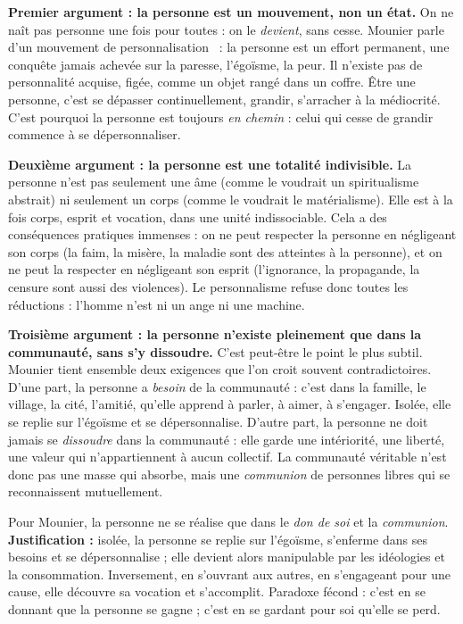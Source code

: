 \documentclass[11pt]{article}
\begin{document}
\textbf{Premier argument : la personne est un mouvement, non un état.} On ne naît pas personne une fois pour toutes : on le \emph{devient}, sans cesse. Mounier parle d'un \guillemotleft mouvement de personnalisation \guillemotright\ : la personne est un effort permanent, une conquête jamais achevée sur la paresse, l'égoïsme, la peur. Il n'existe pas de personnalité acquise, figée, comme un objet rangé dans un coffre. Être une personne, c'est se dépasser continuellement, grandir, s'arracher à la médiocrité. C'est pourquoi la personne est toujours \emph{en chemin} : celui qui cesse de grandir commence à se dépersonnaliser.

\textbf{Deuxième argument : la personne est une totalité indivisible.} La personne n'est pas seulement une âme (comme le voudrait un spiritualisme abstrait) ni seulement un corps (comme le voudrait le matérialisme). Elle est à la fois corps, esprit et vocation, dans une unité indissociable. Cela a des conséquences pratiques immenses : on ne peut respecter la personne en négligeant son corps (la faim, la misère, la maladie sont des atteintes à la personne), et on ne peut la respecter en négligeant son esprit (l'ignorance, la propagande, la censure sont aussi des violences). Le personnalisme refuse donc toutes les réductions : l'homme n'est ni un ange ni une machine.

\textbf{Troisième argument : la personne n'existe pleinement que dans la communauté, sans s'y dissoudre.} C'est peut-être le point le plus subtil. Mounier tient ensemble deux exigences que l'on croit souvent contradictoires. D'une part, la personne a \emph{besoin} de la communauté : c'est dans la famille, le village, la cité, l'amitié, qu'elle apprend à parler, à aimer, à s'engager. Isolée, elle se replie sur l'égoïsme et se dépersonnalise. D'autre part, la personne ne doit jamais se \emph{dissoudre} dans la communauté : elle garde une intériorité, une liberté, une valeur qui n'appartiennent à aucun collectif. La communauté véritable n'est donc pas une masse qui absorbe, mais une \emph{communion} de personnes libres qui se reconnaissent mutuellement.

\begin{propriete}
Pour Mounier, la personne ne se réalise que dans le \emph{don de soi} et la \emph{communion}. \textbf{Justification :} isolée, la personne se replie sur l'égoïsme, s'enferme dans ses besoins et se dépersonnalise ; elle devient alors manipulable par les idéologies et la consommation. Inversement, en s'ouvrant aux autres, en s'engageant pour une cause, elle découvre sa vocation et s'accomplit. Paradoxe fécond : c'est en se donnant que la personne se gagne ; c'est en se gardant pour soi qu'elle se perd.
\end{propriete}
\end{document}
